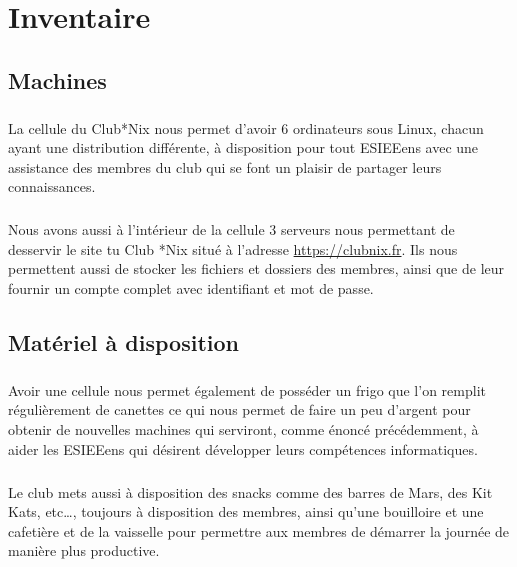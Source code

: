 \documentclass[11pt]{report}
\begin{document}
\chapter{Inventaire}

\section{Machines}

\paragraph{} La cellule du Club*Nix nous permet d'avoir 6 ordinateurs sous
Linux, chacun ayant une distribution différente, à disposition pour tout
ESIEEens avec une assistance des membres du club qui se font un plaisir de
partager leurs connaissances.

\paragraph{} Nous avons aussi à l'intérieur de la cellule 3 serveurs nous
permettant de desservir le site tu Club *Nix situé à l'adresse
\url{https://clubnix.fr}. Ils nous permettent aussi de stocker les fichiers et
dossiers des membres, ainsi que de leur fournir un compte complet avec
identifiant et mot de passe.

\section{Matériel à disposition}

\paragraph{} Avoir une cellule nous permet également de posséder un frigo que
l'on remplit régulièrement de canettes ce qui nous permet de faire un peu
d'argent pour obtenir de nouvelles machines qui serviront, comme énoncé
précédemment, à aider les ESIEEens qui désirent développer leurs compétences
informatiques.

\paragraph{} Le club mets aussi à disposition des snacks comme des barres de
Mars, des Kit Kats, etc\ldots, toujours à disposition des membres, ainsi qu'une
bouilloire et une cafetière et de la vaisselle pour permettre aux membres de
démarrer la journée de manière plus productive.
\end{document}
